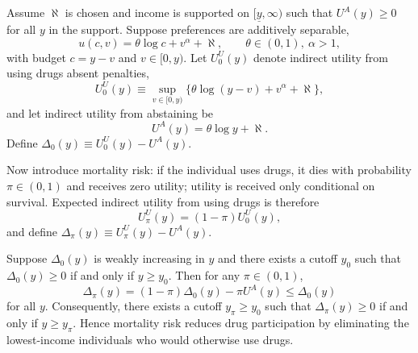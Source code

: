 \begin{lemma}
\label{lem:additive_trim_bottom_users}
Assume $\aleph$ is chosen and income is supported on $[\underline y,\infty)$ such that $U^A(y)\ge 0$ for all $y$ in the support. Suppose preferences are additively separable,
\[
u(c,v)=\theta\log c + v^{\alpha} + \aleph,
\qquad \theta\in(0,1),\ \alpha>1,
\]
with budget $c=y-v$ and $v\in[0,y)$. Let $U_0^U(y)$ denote indirect utility from using drugs absent penalties,
\[
U_0^U(y)\equiv \sup_{v\in[0,y)}\Big\{\theta\log(y-v)+v^{\alpha}+\aleph\Big\},
\]
and let indirect utility from abstaining be
\[
U^A(y)=\theta\log y+\aleph.
\]
Define $\Delta_0(y)\equiv U_0^U(y)-U^A(y)$.

Now introduce mortality risk: if the individual uses drugs, it dies with probability $\pi\in(0,1)$ and receives zero utility; utility is received only conditional on survival. Expected indirect utility from using drugs is therefore
\[
U_\pi^U(y)=(1-\pi)U_0^U(y),
\]
and define $\Delta_\pi(y)\equiv U_\pi^U(y)-U^A(y)$.

Suppose $\Delta_0(y)$ is weakly increasing in $y$ and there exists a cutoff $y_0$ such that $\Delta_0(y)\ge0$ if and only if $y\ge y_0$. Then for any $\pi\in(0,1)$,
\[
\Delta_\pi(y)=(1-\pi)\Delta_0(y)-\pi U^A(y)\le \Delta_0(y)
\]
for all $y$. Consequently, there exists a cutoff $y_\pi\ge y_0$ such that $\Delta_\pi(y)\ge0$ if and only if $y\ge y_\pi$. Hence mortality risk reduces drug participation by eliminating the lowest-income individuals who would otherwise use drugs.
\end{lemma}

